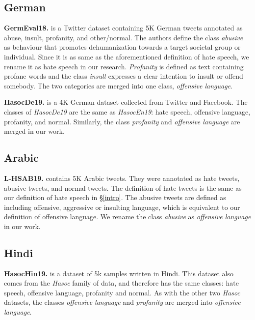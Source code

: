 \documentclass[11pt]{article}
\begin{document}
	\subsection{German}
	
	\textbf{GermEval18.} \citet{wiegand2018overview} is a Twitter dataset containing 5K German tweets annotated as abuse, insult, profanity, and other/normal. The authors define the class \textit{abusive} as behaviour that promotes dehumanization towards a target societal group or individual. Since it is as same as the aforementioned definition of hate speech, we rename it as hate speech in our research. \textit{Profanity} is defined as text containing profane words and the class \textit{insult} expresses a clear intention to insult or offend somebody. The two categories are merged into one class, \textit{offensive language}.
	
	\textbf{HasocDe19.} \citet{mandl2019overview} is a 4K German dataset collected from Twitter and Facebook. The classes of \textit{HasocDe19} are the same as \textit{HasocEn19}: hate speech, offensive language, profanity, and normal. Similarly, the class \textit{profanity} and \textit{offensive language} are merged in our work.
	
	\subsection{Arabic}
	
	\textbf{L-HSAB19.} \citet{mulki-etal-2019-l} contains 5K Arabic tweets. They were annotated as hate tweets, abusive tweets, and normal tweets. The definition of hate tweets is the same as our definition of hate speech in \S\ref{intro}. The abusive tweets are defined as including offensive, aggressive or insulting language, which is equivalent to our definition of offensive language. We rename the class \textit{abusive} as \textit{offensive language} in our work.
	
	\subsection{Hindi} 
	
	\textbf{HasocHin19.} \citet{mandl2019overview} is a dataset of 5k samples written in Hindi. This dataset also comes from the \textit{Hasoc} family of data, and therefore has the same classes: hate speech, offensive language, profanity and normal. As with the other two \textit{Hasoc} datasets, the classes \textit{offensive language} and \textit{profanity} are merged into \textit{offensive language}.
	
\end{document}
